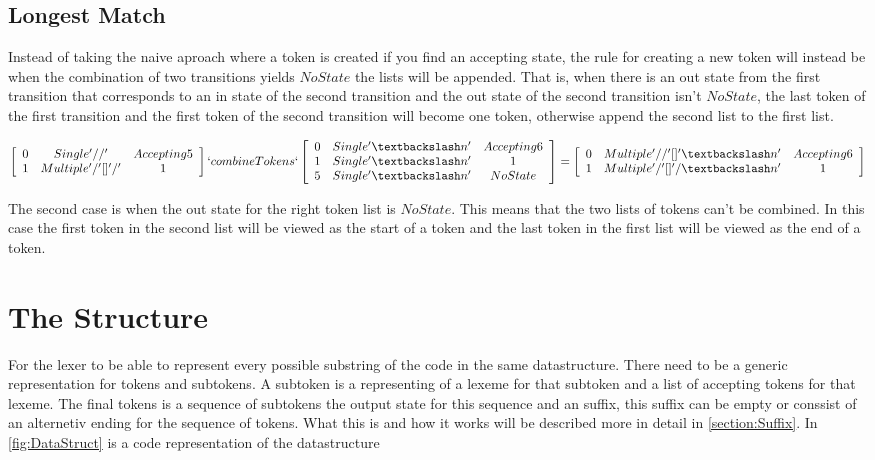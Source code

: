 \subsection{Longest Match}
Instead of taking the naive aproach where a token is created if you find an
accepting state, the rule for creating a new token will instead be when the
combination of two transitions yields $NoState$ the lists will be appended. That
is, when there is an out state from the first transition that corresponds to an
in state of the second transition and the out state of the second transition
isn't $NoState$, the last token of the first transition and the first token of
the second transition will become one token, otherwise append the second list to
the first list.
\begin{center}
$\left[\begin{array}{ccc}
0&Single '//'& Accepting 5\\
1&Multiple '/' [] '/' &1\\
\end{array}\right] `combineTokens` 
\left[\begin{array}{ccc}
0&Single '\textbackslash n'&Accepting 6\\
1&Single '\textbackslash n'&1\\
5&Single '\textbackslash n'&NoState\\
\end{array}\right] =
\left[\begin{array}{ccc}
0&Multiple '//' [] '\textbackslash n'&Accepting 6\\
1&Multiple '/' [] '/\textbackslash n'&1\\
\end{array}\right]$
\end{center}
The second case is when the out state for the right token list is $NoState$.
This means that the two lists of tokens can't be combined. In this case the
first token in the second list will be viewed as the start of a token and the
last token in the first list will be viewed as the end of a token.


\section{The Structure} %
For the lexer to be able to represent every possible substring of the code in the same datastructure. There need to be a generic representation for tokens and subtokens. A subtoken is a representing of a lexeme for that subtoken and a list of accepting tokens for that lexeme. The final tokens is a sequence of subtokens the output state for this sequence and an suffix, this suffix can be empty or conssist of an alternetiv ending for the sequence of tokens. What this is and how it works will be described more in detail in \cref{section:Suffix}.
In \cref{fig:DataStruct} is a code representation of the datastructure

